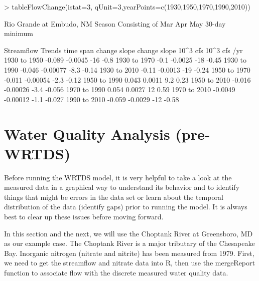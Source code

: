 \documentclass[a4paper,11pt]{article}
\begin{document}
\begin{Schunk}
\begin{Sinput}
> tableFlowChange(istat=3, qUnit=3,yearPoints=c(1930,1950,1970,1990,2010))
\end{Sinput}
\begin{Soutput}
   Rio Grande at Embudo, NM
   Season Consisting of Mar Apr May
    30-day minimum 

             Streamflow Trends
   time span          change        slope       change        slope
                      10^3 cfs 10^3 cfs /yr         %
 1930  to  1950       -0.089      -0.0045          -16         -0.8
 1930  to  1970         -0.1      -0.0025          -18        -0.45
 1930  to  1990       -0.046     -0.00077         -8.3        -0.14
 1930  to  2010        -0.11      -0.0013          -19        -0.24
 1950  to  1970       -0.011     -0.00054         -2.3        -0.12
 1950  to  1990        0.043       0.0011          9.2         0.23
 1950  to  2010       -0.016     -0.00026         -3.4       -0.056
 1970  to  1990        0.054       0.0027           12         0.59
 1970  to  2010      -0.0049     -0.00012         -1.1       -0.027
 1990  to  2010       -0.059      -0.0029          -12        -0.58
\end{Soutput}
\end{Schunk}


\FloatBarrier

\section{Water Quality Analysis (pre-WRTDS)}
\label{sec:wqa}
Before running the WRTDS model, it is very helpful to take a look at the measured data in a graphical way to understand its behavior and to identify things that might be errors in the data set or learn about the temporal distribution of the data (identify gaps) prior to running the model.  It is always best to clear up these issues before moving forward.

In this section and the next, we will use the Choptank River at Greensboro, MD as our example case. The Choptank River is a major tributary of the Chesapeake Bay. Inorganic nitrogen (nitrate and nitrite) has been measured from 1979. First, we need to get the streamflow and nitrate data into R, then use the mergeReport function to associate flow with the discrete measured water quality data.
\end{document}
